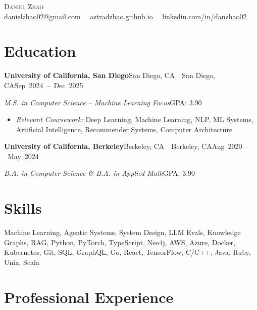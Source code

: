 \documentclass[letterpaper,11pt]{article}
\newcommand{\entry}[3]{%
  \needspace{4\baselineskip}%
  \textbf{#1}\ifx\relax#2\relax\else\ \textbar\ #2\fi\hfill\mbox{#3}\par}
\newcommand{\detail}[2]{\textit{#1}\hfill{#2}\par}
\newenvironment{bullets}
  {\begin{itemize}[leftmargin=1.2em, label=\textbullet, itemsep=0.5pt, parsep=0pt, topsep=2pt]}
  {\end{itemize}\vspace{5pt}}
\begin{document}
\begin{center}
  {\Huge\scshape Daniel Zhao}\\[6pt]
  \href{mailto:danielzhao02@gmail.com}{danielzhao02@gmail.com}\ \textbar\ %
  \href{https://astradzhao.github.io/}{astradzhao.github.io}\ \textbar\ %
  \href{https://www.linkedin.com/in/danzhao02/}{linkedin.com/in/danzhao02}
\end{center}

\section{Education}

\entry{University of California, San Diego}{San Diego, CA}{Sep 2024 -- Dec 2025}
\detail{M.S. in Computer Science -- Machine Learning Focus}{GPA: 3.90}
\begin{bullets}
  \item \textit{Relevant Coursework:} Deep Learning, Machine Learning, NLP, ML Systems, Artificial Intelligence, Recommender Systems, Computer Architecture
\end{bullets}
\vspace{4pt}

\entry{University of California, Berkeley}{Berkeley, CA}{Aug 2020 -- May 2024}
\detail{B.A. in Computer Science \& B.A. in Applied Math}{GPA: 3.90}

\section{Skills}

Machine Learning, Agentic Systems, System Design, LLM Evals, Knowledge Graphs, RAG, Python, PyTorch, TypeScript, Neo4j, AWS, Azure, Docker, Kubernetes, Git, SQL, GraphQL, Go, React, TensorFlow, C/C++, Java, Ruby, Unix, Scala\par

\section{Professional Experience}
\end{document}
